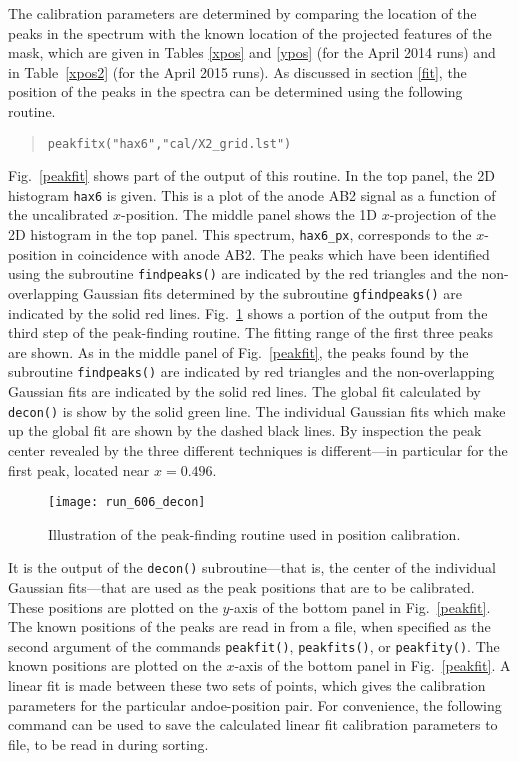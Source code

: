 The calibration parameters are determined by comparing the location of the peaks in the spectrum with the known location of the projected features of the mask, which are given in Tables \ref{xpos} and \ref{ypos} (for the April 2014 runs) and in Table~\ref{xpos2} (for the April 2015 runs). As discussed in section \ref{fit}, the position of the peaks in the spectra can be determined using the following routine.
\vsetroot
\begin{quote}
\begin{Verbatim}[firstnumber=0]
peakfitx("hax6","cal/X2_grid.lst")
\end{Verbatim}
\end{quote}
Fig.~\ref{peakfit} shows part of the output of this routine. In the top panel, the 2D histogram \texttt{hax6} is given. 
This is a plot of the anode AB2 signal as a function of the uncalibrated $x$-position. 
The middle panel shows the 1D $x$-projection of the 2D histogram in the top panel. This spectrum, \texttt{hax6\_px}, corresponds to the $x$-position in coincidence with anode AB2. The peaks which have been identified using the subroutine  \texttt{findpeaks()} are indicated by the red triangles and the non-overlapping Gaussian fits determined by the subroutine \texttt{gfindpeaks()} are indicated by the solid red lines. Fig.~\ref{decon} shows a portion of the output from the third step of the peak-finding routine. The fitting range of the first three peaks are shown. As in the middle panel of Fig.~\ref{peakfit}, the peaks found by the subroutine  \texttt{findpeaks()} are indicated by red triangles and the non-overlapping Gaussian fits are indicated by the solid red lines. The global fit calculated by \texttt{decon()} is show by the solid green line. The individual Gaussian fits which make up the global fit are shown by the dashed black lines. By inspection the peak center revealed by the three different techniques is different---in particular for the first peak, located near $x=0.496$.

\begin{figure}
\texttt{[image: run\_606\_decon]}%
\caption{Illustration of the peak-finding routine used in position calibration.}%
\label{decon}%
\end{figure}

It is the output of the \texttt{decon()} subroutine---that is, the center of the individual Gaussian fits---that are used as the peak positions that are to be calibrated. These positions are plotted on the $y$-axis of the bottom panel in Fig.~\ref{peakfit}. 
The known positions of the peaks are read in from a file, when specified as the second argument of the commands \texttt{peakfit()}, \texttt{peakfits()}, or \texttt{peakfity()}. 
The known positions are plotted on the $x$-axis of the bottom panel in Fig.~\ref{peakfit}. A linear fit is made between these two sets of points, which gives the calibration parameters for the particular andoe-position pair. For convenience, the following command can be used to save the calculated linear fit calibration parameters to file, to be read in during sorting.

